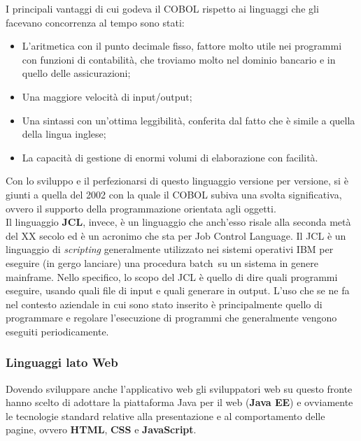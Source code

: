 	I principali vantaggi di cui godeva il COBOL rispetto ai linguaggi che gli facevano concorrenza al tempo sono stati: 
	\begin{itemize}
		\item L'aritmetica con il punto decimale fisso, fattore molto utile nei programmi con funzioni di contabilità, che troviamo molto nel dominio bancario e in quello delle assicurazioni;
		\item Una maggiore velocità di input/output;
		\item Una sintassi con un'ottima leggibilità, conferita dal fatto che è simile a quella della lingua inglese;
		\item La capacità di gestione di enormi volumi di elaborazione con facilità.
	\end{itemize}		

	Con lo sviluppo e il perfezionarsi di questo linguaggio versione per versione, si è giunti a quella del 2002 con la quale il COBOL subiva una svolta significativa, ovvero il supporto della programmazione orientata agli oggetti.\\
	 
	Il linguaggio \textbf{JCL}, invece, è un linguaggio che anch'esso risale alla seconda metà del XX secolo ed è un acronimo che sta per Job Control Language. Il JCL è un linguaggio di \textit{scripting} generalmente utilizzato nei sistemi operativi IBM per eseguire (in gergo lanciare) una procedura batch\glossario\ su un sistema in genere mainframe. Nello specifico, lo scopo del JCL è quello di dire quali programmi eseguire, usando quali file di input e quali generare in output. L'uso che se ne fa nel contesto aziendale in cui sono stato inserito è principalmente quello di programmare e regolare l'esecuzione di programmi che generalmente vengono eseguiti periodicamente.

	\subsubsection{Linguaggi lato Web}

	Dovendo sviluppare anche l'applicativo web gli sviluppatori web su questo
fronte hanno scelto di adottare la piattaforma Java per il web (\textbf{Java EE}) e ovviamente le tecnologie standard relative alla presentazione e al comportamento delle pagine, ovvero \textbf{HTML}, \textbf{CSS} e \textbf{JavaScript}.\\

